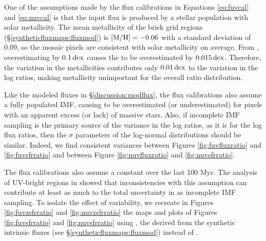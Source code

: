 \documentclass[iop, tighten]{emulateapj}
\begin{document}
One of the assumptions made by the flux calibrations in Equations
\ref{eq:fuvcal} and \ref{eq:nuvcal} is that the input flux is produced by a
stellar population with solar metallicity. The mean metallicity of the brick
grid regions (\S \ref{syntheticfluxmaps:fluxmod}) is $\mathrm{[M/H]} = -0.06$ with a
standard deviation of 0.09, so the mosaic pixels are consistent with solar
metallicity on average. From \citet{Simones:2014}, overestimating \met{} by
$0.1\,\mathrm{dex}$ causes the \sfr{} to be overestimated by $0.015\,\mathrm{dex}$. Therefore, the
variation in the metallicities contributes only $0.01\,\mathrm{dex}$ to the variation in
the log \sfr{} ratios, making metallicity unimportant for the overall \sfr{}
ratio distribution.

Like the modeled fluxes in \S \ref{discussion:modflux}, the flux calibrations
also assume a fully populated IMF, causing \sfrx{} to be overestimated (or
underestimated) for pixels with an apparent excess (or lack) of massive stars.
Also, if incomplete IMF sampling is the primary source of the variance in the
log \sfr{} ratios, as it is for the log flux ratios, then the $\sigma$
parameters of the log-normal distributions should be similar. Indeed, we find
consistent variances between Figures \ref{fig:fuvfluxratio} and
\ref{fig:fuvsfrratio} and between Figure \ref{fig:nuvfluxratio} and
\ref{fig:nuvsfrratio}.

The flux calibrations also assume a constant \sfh{} over the last 100 Myr. The
analysis of UV-bright regions in \citet{Simones:2014} showed that
inconsistencies with this assumption can contribute at least as much to the
total uncertainty in \sfrfuv{} as incomplete IMF sampling. To isolate the
effect of \sfh{} variability, we recreate in Figures \ref{fig:fuvzsfrratio} and
\ref{fig:nuvzsfrratio} the maps and plots of Figures \ref{fig:fuvsfrratio} and
\ref{fig:nuvsfrratio} using \sfrxz{}, the  derived from the synthetic
intrinsic fluxes (see \S \ref{syntheticfluxmaps:fluxmod}) instead of \sfrx{}.
\end{document}
